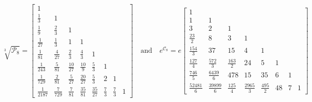 \begin{displaymath}
    \sqrt[3]{\mathcal{P}_{8}}= \left[\begin{matrix}1 &  &  &  &  &  &  & \\\frac{1}{3} & 1 &  &  &  &  &  & \\\frac{1}{9} & \frac{2}{3} & 1 &  &  &  &  & \\\frac{1}{27} & \frac{1}{3} & 1 & 1 &  &  &  & \\\frac{1}{81} & \frac{4}{27} & \frac{2}{3} & \frac{4}{3} & 1 &  &  & \\\frac{1}{243} & \frac{5}{81} & \frac{10}{27} & \frac{10}{9} & \frac{5}{3} & 1 &  & \\\frac{1}{729} & \frac{2}{81} & \frac{5}{27} & \frac{20}{27} & \frac{5}{3} & 2 & 1 & \\\frac{1}{2187} & \frac{7}{729} & \frac{7}{81} & \frac{35}{81} & \frac{35}{27} & \frac{7}{3} & \frac{7}{3} & 1\end{matrix}\right]
    \quad\text{and}\quad
    e^{\mathcal{C}_{8}} = e \left[\begin{matrix}1 &   &   &   &   &   &   &  \\1 & 1 &   &   &   &   &   &  \\3 & 2 & 1 &   &   &   &   &  \\\frac{23}{2} & 8 & 3 & 1 &   &   &   &  \\\frac{154}{3} & 37 & 15 & 4 & 1 &   &   &  \\\frac{1 27}{4} & \frac{572}{3} & \frac{163}{2} & 24 & 5 & 1 &   &  \\\frac{7 46}{5} & \frac{6439}{6} & 478 & 15  & 35 & 6 & 1 &  \\\frac{5 2481}{6 } & \frac{39 899}{6 } & \frac{12  5}{4} & \frac{2965}{3} & \frac{495}{2} & 48 & 7 & 1\end{matrix}\right]
\end{displaymath}
